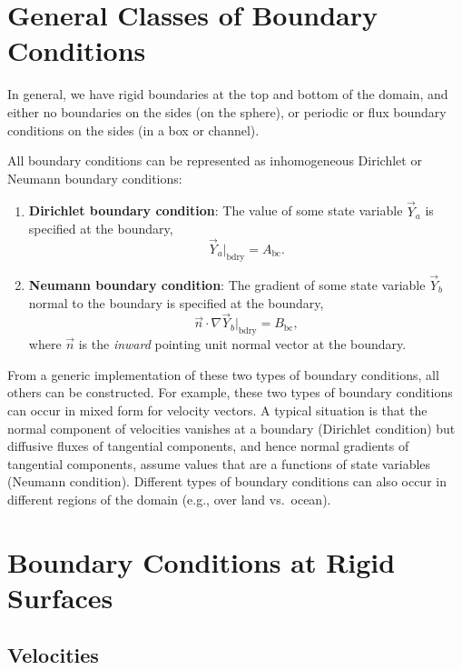 \documentclass{report}
\begin{document}
\section{General Classes of Boundary Conditions}

In general, we have rigid boundaries at the top and bottom of the domain, and either no boundaries on the sides (on the sphere), or periodic or flux boundary conditions on the sides (in a box or channel). 

All boundary conditions can be represented as inhomogeneous Dirichlet or Neumann boundary conditions:
\begin{enumerate}
    \item \textbf{Dirichlet boundary condition}: The value of some state variable $\vec{Y}_a$ is specified at the boundary,
    \[
    \vec{Y}_a\bigl|_\mathrm{bdry} = A_\mathrm{bc}.
    \]
    \item \textbf{Neumann boundary condition}: The gradient of some state variable $\vec{Y}_b$ normal to the boundary is specified at the boundary,
    \[
    \vec{n} \cdot \nabla\vec{Y}_b\bigl|_\mathrm{bdry} = B_\mathrm{bc},
    \] 
    where $\vec{n}$ is the \emph{inward} pointing unit normal vector at the boundary.
\end{enumerate}
From a generic implementation of these two types of boundary conditions, all others can be constructed. For example, these two types of boundary conditions can occur in mixed form for velocity vectors. A typical situation is that the normal component of velocities vanishes at a boundary (Dirichlet condition) but diffusive fluxes of tangential components, and hence normal gradients of tangential components, assume values that are a functions of state variables (Neumann condition). Different types of boundary conditions can also occur in different regions of the domain (e.g., over land vs.\ ocean).

\section{Boundary Conditions at Rigid Surfaces}

\subsection{Velocities}
\end{document}
